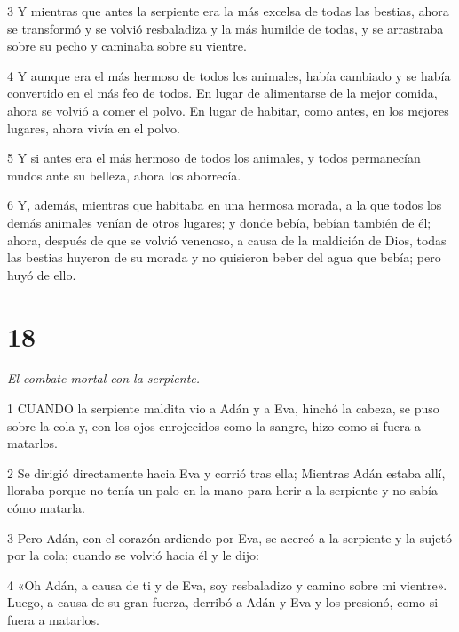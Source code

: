 \par 3 Y mientras que antes la serpiente era la más excelsa de todas las bestias, ahora se transformó y se volvió resbaladiza y la más humilde de todas, y se arrastraba sobre su pecho y caminaba sobre su vientre.

\par 4 Y aunque era el más hermoso de todos los animales, había cambiado y se había convertido en el más feo de todos. En lugar de alimentarse de la mejor comida, ahora se volvió a comer el polvo. En lugar de habitar, como antes, en los mejores lugares, ahora vivía en el polvo.

\par 5 Y si antes era el más hermoso de todos los animales, y todos permanecían mudos ante su belleza, ahora los aborrecía.

\par 6 Y, además, mientras que habitaba en una hermosa morada, a la que todos los demás animales venían de otros lugares; y donde bebía, bebían también de él; ahora, después de que se volvió venenoso, a causa de la maldición de Dios, todas las bestias huyeron de su morada y no quisieron beber del agua que bebía; pero huyó de ello.

\chapter{18}

\par \textit{El combate mortal con la serpiente.}

\par 1 CUANDO la serpiente maldita vio a Adán y a Eva, hinchó la cabeza, se puso sobre la cola y, con los ojos enrojecidos como la sangre, hizo como si fuera a matarlos.

\par 2 Se dirigió directamente hacia Eva y corrió tras ella; Mientras Adán estaba allí, lloraba porque no tenía un palo en la mano para herir a la serpiente y no sabía cómo matarla.

\par 3 Pero Adán, con el corazón ardiendo por Eva, se acercó a la serpiente y la sujetó por la cola; cuando se volvió hacia él y le dijo:

\par 4 «Oh Adán, a causa de ti y de Eva, soy resbaladizo y camino sobre mi vientre». Luego, a causa de su gran fuerza, derribó a Adán y Eva y los presionó, como si fuera a matarlos.

